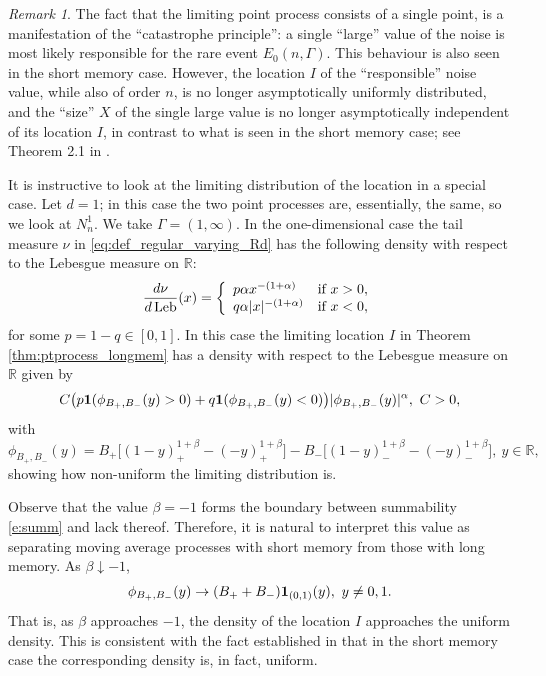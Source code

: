 \documentclass[11pt,reqno]{amsart}
\numberwithin{equation}{section}
\theoremstyle{definition}
\theoremstyle{remark}
\newtheorem{remark}{Remark}[section]
\theoremstyle{definition}
\newcommand{\R}{\mathbb{R}}
\newcommand{\one}{{\bf 1}}
\begin{document}
\begin{remark} \label{rk:jump.loc}
The fact that the limiting point process consists of a single point,
is a manifestation of the ``catastrophe principle'': a single
``large'' value of the noise is most likely responsible for the rare
event $E_0(n,\Gamma)$. This behaviour is also seen in the short memory
case. However, the location $I$ of the ``responsible'' noise value, while also of
order $n$, is no longer asymptotically uniformly distributed, and the
``size'' $X$ of the single large value is no longer asymptotically
independent of its location $I$, in
contrast to what is seen in the short memory case; see Theorem 2.1 in
\cite{wang:samorodnitsky:2025}. 

 It is instructive to look at the limiting distribution of the location
in a special case. Let  $d=1$; in this case the two point processes are, essentially, the same, so we look at $N_n^1$. We take $\Gamma=(1,\infty)$. In the
one-dimensional case the tail measure $\nu$ in
\eqref{eq:def_regular_varying_Rd} has the following density with
respect to the Lebesgue measure on $\R$:
\begin{equation} \label{e:nu.d1}
\frac{d\nu}{d\, {\rm Leb}}(x) = \left\{ \begin{array}{ll}
                                       p\alpha x^{-(1+\alpha)}
                                       &\text{if} \ x>0,\\
                                       q\alpha |x|^{-(1+\alpha)}
                                       &\text{if} \ x<0,
                                     \end{array}
\right.                                     
\end{equation}
for some $p=1-q\in [0,1]$. In this case the limiting location $I$ in
Theorem \ref{thm:ptprocess_longmem} has a density with
respect to the  Lebesgue measure on $\R$ given by
\[
    C\bigl(
    p\one(\phi_{B_+,B_-}(y)>0)+q\one(\phi_{B_+,B_-}(y)<0)\bigr)|\phi_{B_+,B_-}(y)|^\alpha,
    \ C>0,
  \]
with 
 \begin{equation} \label{e:phi.1}
    \phi_{B_+,B_-}(y) = B_+\big[(1-y)_+^{1+\beta} - (-y)_+^{1+\beta}\big] -
    B_-\big[(1-y)_-^{1+\beta} - (-y)_-^{1+\beta}\big], \ y\in\R,
\end{equation}
showing how non-uniform the limiting distribution is. 

Observe that the value  $\beta=-1$ forms  the boundary
  between summability \eqref{e:summ} and lack thereof. Therefore, 
it is natural to interpret this value as separating moving average
processes with short memory from those with long memory.  
As $\beta\downarrow -1$, 
\[
\phi_{B_+,B_-}(y)\to (B_++B_-)\one_{(0,1)}(y), \ y\not= 0,1.
\]
That is, as $\beta$ approaches $-1$, the density of the location $I$
approaches  the uniform density. This is consistent with the
fact established in \cite{wang:samorodnitsky:2025} 
that in the short memory case the corresponding density is, in fact,
uniform. 



\end{remark}
\end{document}
